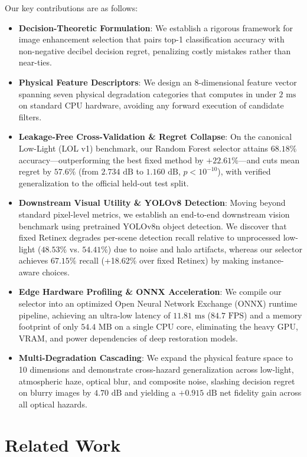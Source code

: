 \documentclass[journal]{IEEEtran}
\begin{document}
Our key contributions are as follows:
\begin{itemize}
    \item \textbf{Decision-Theoretic Formulation}: We establish a rigorous framework for image enhancement selection that pairs top-1 classification accuracy with non-negative decibel decision regret, penalizing costly mistakes rather than near-ties.
    \item \textbf{Physical Feature Descriptors}: We design an 8-dimensional feature vector spanning seven physical degradation categories that computes in under $2\text{ ms}$ on standard CPU hardware, avoiding any forward execution of candidate filters.
    \item \textbf{Leakage-Free Cross-Validation \& Regret Collapse}: On the canonical Low-Light (LOL v1) benchmark, our Random Forest selector attains $68.18\%$ accuracy—outperforming the best fixed method by $+22.61\%$—and cuts mean regret by $57.6\%$ (from $2.734\text{ dB}$ to $1.160\text{ dB}$, $p < 10^{-10}$), with verified generalization to the official held-out test split.
    \item \textbf{Downstream Visual Utility \& YOLOv8 Detection}: Moving beyond standard pixel-level metrics, we establish an end-to-end downstream vision benchmark using pretrained YOLOv8n object detection. We discover that fixed Retinex degrades per-scene detection recall relative to unprocessed low-light ($48.53\%$ vs. $54.41\%$) due to noise and halo artifacts, whereas our selector achieves $67.15\%$ recall (+18.62\% over fixed Retinex) by making instance-aware choices.
    \item \textbf{Edge Hardware Profiling \& ONNX Acceleration}: We compile our selector into an optimized Open Neural Network Exchange (ONNX) runtime pipeline, achieving an ultra-low latency of $11.81\text{ ms}$ ($84.7\text{ FPS}$) and a memory footprint of only $54.4\text{ MB}$ on a single CPU core, eliminating the heavy GPU, VRAM, and power dependencies of deep restoration models.
    \item \textbf{Multi-Degradation Cascading}: We expand the physical feature space to 10 dimensions and demonstrate cross-hazard generalization across low-light, atmospheric haze, optical blur, and composite noise, slashing decision regret on blurry images by $4.70\text{ dB}$ and yielding a $+0.915\text{ dB}$ net fidelity gain across all optical hazards.
\end{itemize}

\section{Related Work}
\end{document}

